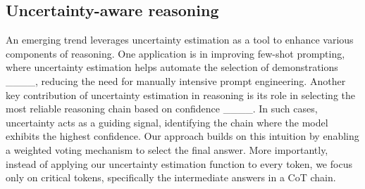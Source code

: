 \subsection{Uncertainty-aware reasoning}
An emerging trend leverages uncertainty estimation as a tool to enhance various components of reasoning. One application is in improving few-shot prompting, where uncertainty estimation helps automate the selection of demonstrations ____, reducing the need for manually intensive prompt engineering. Another key contribution of uncertainty estimation in reasoning is its role in selecting the most reliable reasoning chain based on confidence ____. In such cases, uncertainty acts as a guiding signal, identifying the chain where the model exhibits the highest confidence. Our approach builds on this intuition by enabling a weighted voting mechanism to select the final answer. More importantly, instead of applying our uncertainty estimation function to every token, we focus only on critical tokens, specifically the intermediate answers in a CoT chain.


